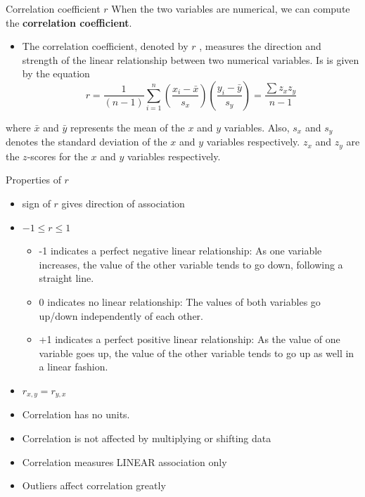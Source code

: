 \documentclass[
  ignorenonframetext,
]{beamer}
\providecommand{\tightlist}{%
  \setlength{\itemsep}{0pt}\setlength{\parskip}{0pt}}
\begin{document}
\begin{frame}{Correlation coefficient \(r\)}
\protect{}\label{correlation-coefficient-r}
When the two variables are numerical, we can compute the
\textbf{correlation coefficient}.

\begin{itemize}
\tightlist
\item
  The correlation coefficient, denoted by \(r\) , measures the direction
  and strength of the linear relationship between two numerical
  variables. Is is given by the equation
  \[r=\frac{1}{(n-1)}\sum_{i=1}^n \left(\frac{x_i-\bar{x}}{s_x}\right)\left(\frac{y_i-\bar{y}}{s_y}\right)=\frac{\sum z_x z_y}{n-1}\]
\end{itemize}

where \(\bar{x}\) and \(\bar{y}\) represents the mean of the \(x\) and
\(y\) variables. Also, \(s_x\) and \(s_y\) denotes the standard
deviation of the \(x\) and \(y\) variables respectively. \(z_x\) and
\(z_y\) are the \(z\)-scores for the \(x\) and \(y\) variables
respectively.
\end{frame}

\begin{frame}{Properties of \(r\)}
\protect{}\label{properties-of-r}
\begin{itemize}
\item
  sign of \(r\) gives direction of association
\item
  \(-1\leq r \leq 1\)

  \begin{itemize}
  \tightlist
  \item
    -1 indicates a perfect negative linear relationship: As one variable
    increases, the value of the other variable tends to go down,
    following a straight line.
  \item
    0 indicates no linear relationship: The values of both variables go
    up/down independently of each other.
  \item
    +1 indicates a perfect positive linear relationship: As the value of
    one variable goes up, the value of the other variable tends to go up
    as well in a linear fashion.
  \end{itemize}
\item
  \(r_{x,y}= r_{y,x}\)
\item
  Correlation has no units.
\item
  Correlation is not affected by multiplying or shifting data
\item
  Correlation measures LINEAR association only
\item
  Outliers affect correlation greatly
\end{itemize}
\end{frame}
\end{document}
